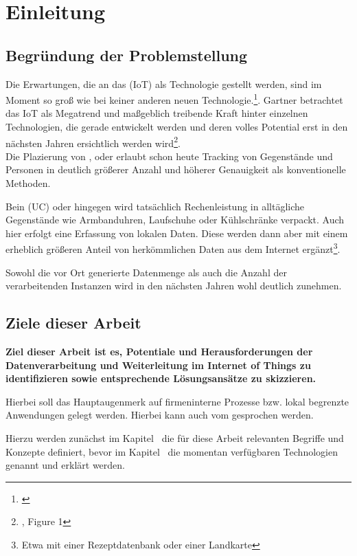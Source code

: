 \section{Einleitung}
\label{sec:einleitung}

\subsection{Begründung der Problemstellung}

Die Erwartungen, die an das  (IoT) als Technologie gestellt werden, sind im Moment so groß wie bei keiner anderen neuen Technologie.\footnote{\cite{ghc14}}. Gartner betrachtet das IoT als Megatrend und maßgeblich treibende Kraft hinter einzelnen Technologien, die gerade entwickelt werden und deren volles Potential erst in den nächsten Jahren ersichtlich werden wird\footnote{\cite{gartner2014}, Figure 1}.\\
Die Plazierung von ,  oder  erlaubt schon heute Tracking von  Gegenstände und Personen in deutlich größerer Anzahl und höherer Genauigkeit als konventionelle Methoden.

Bein  (UC) oder  hingegen wird tatsächlich Rechenleistung in alltägliche Gegenstände wie Armbanduhren, Laufschuhe oder Kühlschränke verpackt. Auch hier erfolgt eine Erfassung von lokalen Daten. Diese werden dann aber mit einem erheblich größeren Anteil von herkömmlichen Daten aus dem Internet ergänzt\footnote{Etwa mit einer Rezeptdatenbank oder einer Landkarte}.

Sowohl die vor Ort generierte Datenmenge als auch die Anzahl der verarbeitenden Instanzen wird in den nächsten Jahren wohl deutlich zunehmen.

\subsection{Ziele dieser Arbeit}

\textbf{Ziel dieser Arbeit ist es, Potentiale und Herausforderungen der Datenverarbeitung und Weiterleitung im Internet of Things zu identifizieren sowie entsprechende Lösungsansätze zu skizzieren.}

Hierbei soll das Hauptaugenmerk auf firmeninterne Prozesse bzw. lokal begrenzte Anwendungen gelegt werden. Hierbei kann auch vom  gesprochen werden.

Hierzu werden zunächst im Kapitel~ die für diese Arbeit relevanten Begriffe und Konzepte definiert, bevor im Kapitel~ die momentan verfügbaren Technologien genannt und erklärt werden. 

